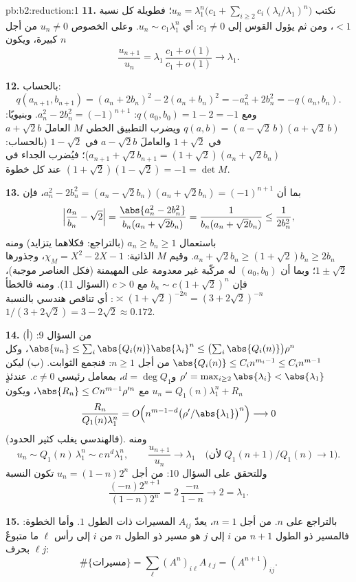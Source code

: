 \begin{solution}{pb:b2:reduction:1}
\textbf{11.} نكتب $u_n = \lambda_1^n\bigl(c_1 + \sum_{i\geq2}
c_i(\lambda_i/\lambda_1)^n\bigr)$؛ فطويلة كل نسبة $< 1$،
ومن ثم يؤول القوس إلى $c_1 \neq 0$: أي $u_n \sim c_1\lambda_1^n$.
وعلى الخصوص $u_n \neq 0$ من أجل $n$ كبيرة، ويكون
\[
\frac{u_{n+1}}{u_n} =
\lambda_1\,\frac{c_1 + o(1)}{c_1 + o(1)} \longrightarrow
\lambda_1 .
\]

\textbf{12.} بالحساب:
\[
q(a_{n+1}, b_{n+1}) = (a_n + 2b_n)^2 - 2(a_n + b_n)^2
= -a_n^2 + 2b_n^2 = -q(a_n, b_n).
\]
ومع $q(a_0, b_0) = 1 - 2 = -1$: $a_n^2 - 2b_n^2 = (-1)^{n+1}$.
وبنيويًا: $q(a, b) = (a - \sqrt2\,b)(a + \sqrt2\,b)$ ويضرب
التطبيق الخطي $M$ العاملَ $a + \sqrt2 b$ في $1 +
\sqrt2$ والعاملَ $a - \sqrt2 b$ في $1 - \sqrt2$ (بالحساب:
$a_{n+1} + \sqrt2 b_{n+1} = (1 + \sqrt2)(a_n + \sqrt2 b_n)$)؛
فيُضرب الجداء في $(1 + \sqrt2)(1 - \sqrt2) = -1 =
\det M$ عند كل خطوة.

\textbf{13.} بما أن $a_n^2 - 2b_n^2 = (a_n - \sqrt2 b_n)(a_n +
\sqrt2 b_n) = (-1)^{n+1}$، فإن
\[
\Bigl|\frac{a_n}{b_n} - \sqrt2\Bigr|
= \frac{\abs{a_n^2 - 2b_n^2}}{b_n(a_n + \sqrt2 b_n)}
= \frac{1}{b_n(a_n + \sqrt2 b_n)} \leq \frac1{2b_n^2},
\]
باستعمال $a_n \geq b_n \geq 1$ (بالتراجع: فكلاهما يتزايد) ومنه $a_n +
\sqrt2 b_n \geq (1 + \sqrt2)b_n \geq 2b_n$. وقيم $M$ الذاتية:
$\chi_M = X^2 - 2X - 1$، وجذورها $1 \pm \sqrt2$؛ وبما أن $(a_0, b_0)$
له مركّبة غير معدومة على  المهيمنة (فكل العناصر
موجبة)، فإن $b_n \sim c(1 + \sqrt2)^n$ مع $c > 0$ (السؤال
11). ومنه فالخطأ $\asymp (1 + \sqrt2)^{-2n} = (3 +
2\sqrt2)^{-n}$: أي تناقص هندسي بالنسبة $1/(3 + 2\sqrt2) = 3
- 2\sqrt2 \approx 0.172$.

\textbf{14.} (أ) من السؤال 9: $\abs{u_n} \leq \sum_i
\abs{Q_i(n)}\abs{\lambda_i}^n \leq \bigl(\sum_i
\abs{Q_i(n)}\bigr)\rho^n$، وكل $\abs{Q_i(n)} \leq C_i
n^{m_i - 1} \leq C_i n^{m-1}$ من أجل $n \geq 1$: فنجمع الثوابت.
(ب) ليكن $\rho' = \max_{i \geq 2}\abs{\lambda_i} <
\abs{\lambda_1}$ و$d = \deg Q_1$، بمعامل رئيسي $c
\neq 0$. عندئذٍ $u_n = Q_1(n)\lambda_1^n + R_n$ مع $\abs{R_n}
\leq Cn^{m-1}\rho'^n$، ويكون
\[
\frac{R_n}{Q_1(n)\lambda_1^n} = O\Bigl(n^{m-1-d}
\bigl(\rho'/\abs{\lambda_1}\bigr)^n\Bigr) \longrightarrow 0
\]
(فالهندسي يغلب كثير الحدود). ومنه
\[
u_n \sim Q_1(n)\,\lambda_1^n \sim c\,n^d\lambda_1^n,
\qquad
\frac{u_{n+1}}{u_n} \longrightarrow \lambda_1
\quad\text{(لأن } Q_1(n{+}1)/Q_1(n) \to 1\text{)}.
\]
وللتحقق على السؤال 10: من أجل $u_n = (1-n)2^n$ تكون النسبة
\[
\frac{(-n)2^{n+1}}{(1-n)2^n} = 2\,\frac{-n}{1-n}
\longrightarrow 2 = \lambda_1 .
\]

\textbf{15.} بالتراجع على $n$. من أجل $n = 1$، يعدّ $A_{ij}$
المسيرات ذات الطول $1$. وأما الخطوة: فالمسير ذو الطول $n + 1$ من $i$ إلى
$j$ هو مسير ذو الطول $n$ من $i$ إلى رأس $\ell$ ما
متبوعٌ بحرف $\ell j$:
\[
\#\{\text{مسيرات}\} = \sum_{\ell} (A^n)_{i\ell}A_{\ell j} =
(A^{n+1})_{ij}.
\]


\end{solution}
